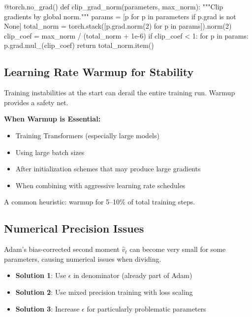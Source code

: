 \documentclass[../../main.tex]{subfiles}
\begin{document}
\begin{pythoncode}
@torch.no_grad()
def clip_grad_norm(parameters, max_norm):
    """Clip gradients by global norm."""
    params = [p for p in parameters if p.grad is not None]
    total_norm = torch.stack([p.grad.norm(2) for p in params]).norm(2)
    clip_coef = max_norm / (total_norm + 1e-6)
    if clip_coef < 1:
        for p in params:
            p.grad.mul_(clip_coef)
    return total_norm.item()
\end{pythoncode}

\subsection{Learning Rate Warmup for Stability}

Training instabilities at the start can derail the entire training run. Warmup provides a safety net.

\begin{important}
\textbf{When Warmup is Essential:}
\begin{itemize}
    \item Training Transformers (especially large models)
    \item Using large batch sizes
    \item After initialization schemes that may produce large gradients
    \item When combining with aggressive learning rate schedules
\end{itemize}
A common heuristic: warmup for 5--10\% of total training steps.
\end{important}

\subsection{Numerical Precision Issues}

Adam's bias-corrected second moment $\hat{v}_t$ can become very small for some parameters, causing numerical issues when dividing.

\begin{itemize}
    \item \textbf{Solution 1}: Use $\epsilon$ in denominator (already part of Adam)
    \item \textbf{Solution 2}: Use mixed precision training with loss scaling
    \item \textbf{Solution 3}: Increase $\epsilon$ for particularly problematic parameters
\end{itemize}
\end{document}
